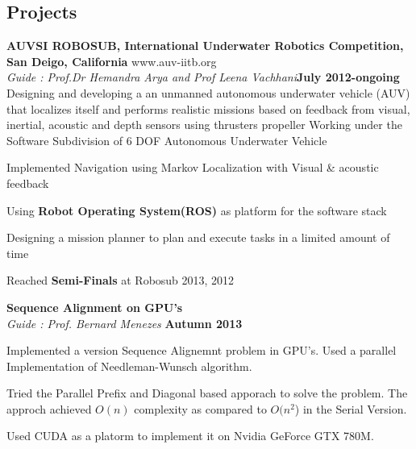 \documentclass[margin,11pt]{resume}
\begin{document}
\begin{resume}
\section{\mysidestyle Projects}
    \textbf{AUVSI ROBOSUB, International Underwater Robotics Competition, San Deigo, California } \hfill www.auv-iitb.org
    \vspace{1mm}\\ 
                        \textsl{Guide : Prof.Dr Hemandra Arya and Prof Leena Vachhani}\hfill \textbf{July 2012-ongoing}\\Designing and developing a an unmanned autonomous underwater vehicle (AUV) that localizes itself and performs 	realistic missions based on feedback from visual, inertial, acoustic and depth sensors 	using thrusters\/ propeller 	
                    Working under the Software Subdivision of 6 DOF Autonomous Underwater Vehicle 
                    \begin{list2} 
                        \item Implemented Navigation using Markov Localization with Visual \& acoustic feedback
                        \item Using \textbf{Robot Operating System(ROS)} as platform for the software stack
                        \item Designing a mission planner to plan  and execute tasks in a limited amount of time	
                        \item Reached \textbf{Semi-Finals} at Robosub 2013, 2012\vspace{-2.75mm} 
                        \end{list2}
\textbf{Sequence Alignment on GPU's }\vspace{1mm} \hfill\\
    \textsl{Guide : Prof. Bernard Menezes} \hfill \textbf{Autumn 2013} \vspace{-4mm}\\ 
		 \begin{list2}
             \item Implemented a version Sequence Alignemnt problem in GPU's. Used a parallel Implementation of Needleman-Wunsch algorithm.
             \item Tried the Parallel Prefix and Diagonal based apporach to solve the problem. The approch achieved $O(n)$ complexity as compared to $O(n^{2}$) in the Serial Version.
             \item Used CUDA as a platorm to implement it on Nvidia GeForce GTX 780M.   
		\end{list2} \vspace{-2.75mm} 


\end{resume}
\end{document}
